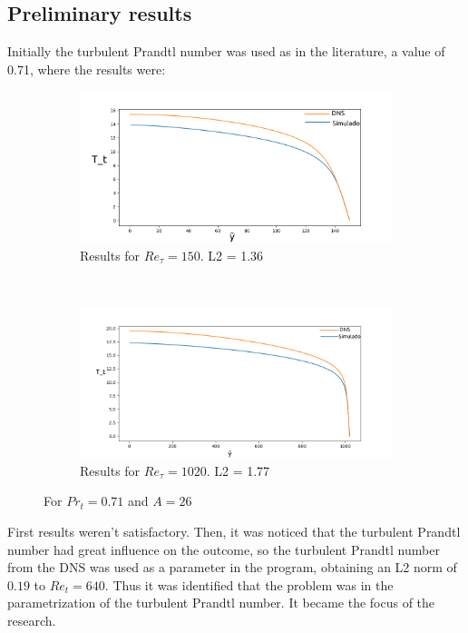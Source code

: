 \documentclass[10pt]{article} %
\begin{document}
\subsection{Preliminary results}
Initially the turbulent Prandtl number was used as in the literature, a value of 0.71, where the results were:\\
	\begin{figure}[h!]
		\centering
		\begin{subfigure}[t]{0.45\textwidth}
		\centering
		\includegraphics[angle=0, scale=0.24]{150orto}
		\caption{Results for $Re_\tau = 150$. L2 = 1.36 }
		\end{subfigure}%
		~
		\begin{subfigure}[t]{0.45\textwidth}
		\centering
		\includegraphics[angle=0, scale=0.24]{1020orto}
		\caption{Results for $Re_\tau = 1020$. L2 = 1.77}
		\end{subfigure}
	\caption{For $Pr_t = 0.71$ and $A = 26$} 
	\end{figure}	

First results weren't satisfactory. Then, it was noticed that the turbulent Prandtl number had great influence on the outcome, so the turbulent Prandtl number from the DNS was used as a parameter in the program, obtaining an L2 norm of $ 0.19 $ to $ Re_t = 640 $. Thus it was identified that the problem was in the parametrization of the turbulent Prandtl number. It became the focus of the research.
\end{document}
